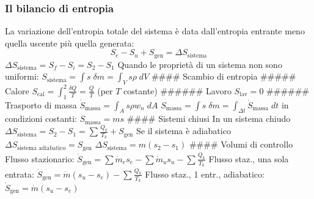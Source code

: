 \hypertarget{il-bilancio-di-entropia}{%
\subsubsection{Il bilancio di entropia}\label{il-bilancio-di-entropia}}

La variazione dell'entropia totale del sistema è data dall'entropia
entrante meno quella uscente più quella generata:
\[S_e-S_u+S_\text{gen}=\Delta S_\text{sistema}\]
\(\Delta S_\text{sistema}=S_f-S_i=S_2-S_1\) Quando le proprietà di un
sistema non sono uniformi:
\(S_\text{sistema}=\int s\;\delta m=\int_V s\rho \;dV\) \#\#\#\# Scambio
di entropia \#\#\#\#\# Calore
\(S_\text{cal}=\int_1^2\frac{\delta Q}{T}=\frac{Q}{T}\) (per \(T\)
costante) \#\#\#\#\#\# Lavoro \(S_\text{lav}=0\) \#\#\#\#\#\# Trasporto
di massa \(\dot S_\text{massa}=\int_A s\rho w_n\;dA\)
\(S_\text{massa}=\int s\;\delta m=\int_{\Delta t}\dot S_\text{massa}\;dt\)
in condizioni costanti: \(S_\text{massa}=ms\) \#\#\#\# Sistemi chiusi In
un sistema chiudo
\(\Delta S_\text{sistema}=S_2-S_1=\sum \frac{Q_k}{T_k} +S_\text{gen}\)
Se il sistema è adiabatico
\(\Delta S_\text{sistema adiabatico}=S_\text{gen}\)
\(\Delta S_\text{sistema}=m(s_2-s_1)\) \#\#\#\# Volumi di controllo
Flusso stazionario:
\(\dot S_\text{gen}=\sum \dot m_e s_e-\sum \dot m_u s_u - \sum \frac{\dot Q_k}{T_k}\)
Flusso staz., una sola entrata:
\(\dot S_\text{gen}=\dot m(s_u-s_e)-\sum \frac{\dot Q_k}{T_k}\) Flusso
staz., 1 entr., adiabatico: \(\dot S_\text{gen}=\dot m(s_u-s_e)\)
